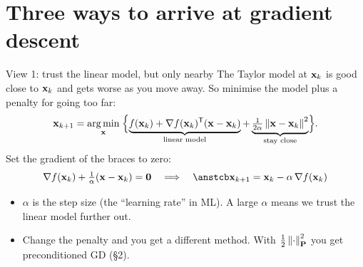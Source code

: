 \section{Three ways to arrive at gradient descent}

\begin{frame}{View 1: trust the linear model, but only nearby}
  The Taylor model at $\mathbf{x}_k$ is good close to $\mathbf{x}_k$ and gets worse as you move away. So minimise the model
  plus a penalty for going too far:
  \[
    \mathbf{x}_{k+1} = \operatorname*{arg\,min}_{\mathbf{x}}\;\Bigl\{\underbrace{f(\mathbf{x}_k) + \nabla f(\mathbf{x}_k)^{\mathsf T}(\mathbf{x} - \mathbf{x}_k)}_{\text{linear model}}
      + \underbrace{\tfrac{1}{2\alpha}\left\lVert \mathbf{x} - \mathbf{x}_k \right\rVert^2}_{\text{stay close}}\Bigr\}.
  \]
  Set the gradient of the braces to zero:
  \[
    \nabla f(\x_k) + \tfrac1\alpha(\x - \x_k) = \mathbf 0
    \quad\Longrightarrow\quad
    \ans{\x_{k+1} = \x_k - \alpha\,\nabla f(\x_k)}
  \]
  \begin{itemize}\small
    \item $\alpha$ is the \alert{step size} (the ``learning rate'' in ML). A large $\alpha$ means we trust the linear model further out.
    \item Change the penalty and you get a different method. With $\tfrac12\left\lVert \cdot \right\rVert_{\mathbf{P}}^2$ you get preconditioned GD (\S2).
  \end{itemize}
\end{frame}

